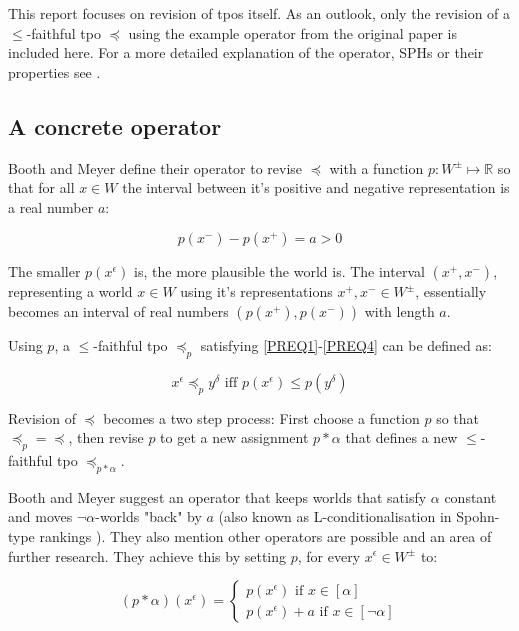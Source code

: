 \documentclass[english, 12pt]{scrartcl}
\theoremstyle{definition}
\theoremstyle{definition}
\theoremstyle{definition}
\begin{document}
This report focuses on revision of tpos itself. As an outlook, only the revision of a $\leq$-faithful tpo $\preceq$ using the example operator from the original paper is included here. For a more detailed explanation of the operator, SPHs or their properties see \cite{Booth2011}.

\subsection{A concrete operator}
Booth and Meyer define their operator to revise $\preceq$ with a function $p: W^{\pm} \mapsto \mathds{R}$ so that for all $x \in W$ the interval between it's positive and negative representation is a real number $a$:

\begin{equation*}
    p(x^{-}) - p(x^{+}) = a > 0
\end{equation*}

The smaller $p(x^{\epsilon})$ is, the more plausible the world is. The interval $(x^{+}, x^{-})$, representing a world $x \in W$ using it's representations $x^{+}, x^{-} \in W^{\pm}$, essentially becomes an interval of real numbers $(p(x^{+}), p(x^{-}))$ with length $a$.

\bigskip

Using $p$, a $\leq$-faithful tpo $\preceq_{p}$ satisfying \ref{PREQ1}-\ref{PREQ4} can be defined as:

\begin{equation*}
    x^{\epsilon} \preceq_{p} y^{\delta} \textrm{ iff } p(x^{\epsilon}) \leq p(y^{\delta} )
\end{equation*}

\bigskip

Revision of $\preceq$ becomes a two step process: First choose a function $p$ so that $\preceq_{p} = \preceq$, then revise $p$ to get a new assignment $p \ast \alpha$ that defines a new $\leq$-faithful tpo $\preceq_{p \ast \alpha}$.

Booth and Meyer suggest an operator that keeps worlds that satisfy $\alpha$ constant and moves $\neg\alpha$-worlds "back" by $a$ (also known as L-conditionalisation in Spohn-type rankings \cite{Geffner1992}). They also mention other operators are possible and an area of further research. They achieve this by setting $p$, for every $x^{\epsilon} \in W^{\pm}$ to:
    
\begin{equation*}
    (p \ast \alpha)(x^{\epsilon}) = \left\{
                    \begin{array}{ll}
                      p(x^{\epsilon}) \textrm{ if } x \in [\alpha]\\
                      p(x^{\epsilon}) + a \textrm{ if } x \in [\neg\alpha]
                    \end{array}
                  \right.
\end{equation*}
\end{document}
